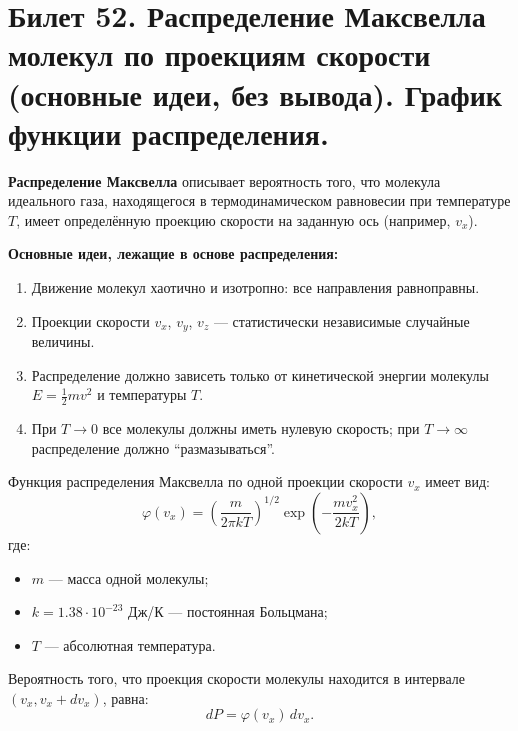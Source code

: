 \section{Билет 52. Распределение Максвелла молекул по проекциям скорости (основные идеи, без вывода). График функции распределения.}

\begin{definition}
\textbf{Распределение Максвелла} описывает вероятность того, что молекула идеального газа, находящегося в термодинамическом равновесии при температуре $T$, имеет определённую проекцию скорости на заданную ось (например, $v_x$).
\par\noindent\textbf{Основные идеи, лежащие в основе распределения:}
\begin{enumerate}
    \item Движение молекул хаотично и изотропно: все направления равноправны.
    \item Проекции скорости $v_x$, $v_y$, $v_z$ --- статистически независимые случайные величины.
    \item Распределение должно зависеть только от кинетической энергии молекулы $E = \frac{1}{2} m v^2$ и температуры $T$.
    \item При $T \to 0$ все молекулы должны иметь нулевую скорость; при $T \to \infty$ распределение должно ``размазываться''.
\end{enumerate}
\end{definition}

\begin{definition}
Функция распределения Максвелла по одной проекции скорости $v_x$ имеет вид:
\begin{equation}
    \varphi(v_x) = \left( \frac{m}{2\pi k T} \right)^{1/2} \exp\left( -\frac{m v_x^2}{2 k T} \right), \label{eq:maxwell_vx_52}
\end{equation}
где:
\begin{itemize}
    \item $m$ --- масса одной молекулы;
    \item $k = 1.38 \cdot 10^{-23}$ Дж/К --- постоянная Больцмана;
    \item $T$ --- абсолютная температура.
\end{itemize}
Вероятность того, что проекция скорости молекулы находится в интервале $(v_x, v_x + dv_x)$, равна:
\begin{equation}
    dP = \varphi(v_x) \, dv_x.
\end{equation}
\end{definition}


